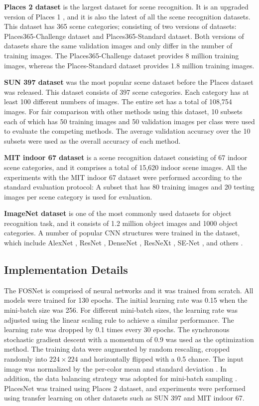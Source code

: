 \documentclass[journal,comsoc]{IEEEtran}
\begin{document}
\textbf{Places 2 dataset} \cite{b20} is the largest dataset for scene recognition. It is an upgraded version of Places 1 \cite{b35}, and it is also the latest of all the scene recognition datasets. This dataset has 365 scene categories; consisting of two versions of datasets: Places365-Challenge dataset and Places365-Standard dataset. Both versions of datasets share the same validation images and only differ in the number of training images. The Places365-Challenge dataset provides 8 million training images, whereas the Places-Standard dataset provides 1.8 million training images.

\textbf{SUN 397 dataset} \cite{b33} was the most popular scene dataset before the Places dataset \cite{b20,b35} was released. This dataset consists of 397 scene categories. Each category has at least 100 different numbers of images. The entire set has a total of 108,754 images. For fair comparison with other methods using this dataset, 10 subsets each of which has 50 training images and 50 validation images per class were used to evaluate the competing methods. The average validation accuracy over the 10 subsets were used as the overall accuracy of each method. 

\textbf{MIT indoor 67 dataset} \cite{b34} is a scene recognition dataset consisting of 67 indoor scene categories, and it comprises a total of 15,620 indoor scene images. All the experiments with the MIT indoor 67 dataset were performed according to the standard evaluation protocol: A subset that has 80 training images and 20 testing images per scene category is used for evaluation. 

\textbf{ImageNet dataset} \cite{b19} is one of the most commonly used datasets for object recognition task, and it consists of 1.2 million object images and 1000 object categories. A number of popular CNN structures were trained in the dataset, which include AlexNet \cite{b18}, ResNet \cite{b23}, DenseNet \cite{b26}, ResNeXt \cite{b27}, SE-Net \cite{b28}, and others \cite{b29,b30,b31}.



\subsection{Implementation Details}
\label{s42}
The FOSNet is comprised of neural networks and it was trained from scratch. All models were trained for 130 epochs. The initial learning rate was 0.15 when the mini-batch size was 256. For different mini-batch sizes, the learning rate was adjusted using the linear scaling rule \cite{b37} to achieve a similar performance. The learning rate was dropped by 0.1 times every 30 epochs. The synchronous stochastic gradient descent with a momentum of 0.9 was used as the optimization method. The training data were augmented by random rescaling, cropped randomly into $224 \times 224$ \cite{b30,b46} and horizontally flipped with a 0.5 chance. The input image was normalized by the per-color mean and standard deviation \cite{b46}. In addition, the data balancing strategy \cite{b11} was adopted for mini-batch sampling \cite{b28}. PlacesNet was trained using Places 2 dataset, and experiments were performed using transfer learning \cite{b38} on other datasets such as SUN 397 and MIT indoor 67.
\end{document}
